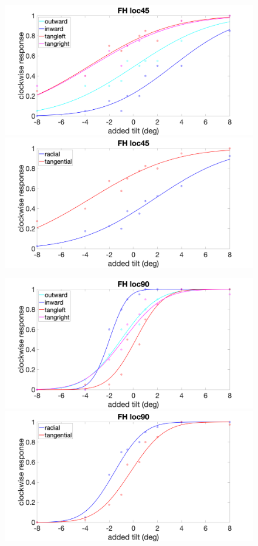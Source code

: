 \documentclass[11pt]{article} %
\begin{document}
\begin{figure}[H]
\centering %
\includegraphics[scale=.15]{Images/FH_PF_loc45_4conds.png}
\includegraphics[scale=.15]{Images/FH_PF_loc45_2conds.png}
\end{figure}
\begin{figure}[H]
\centering %
\includegraphics[scale=.15]{Images/FH_PF_loc90_4conds.png}
\includegraphics[scale=.15]{Images/FH_PF_loc90_2conds.png}
\end{figure}
\end{document}
